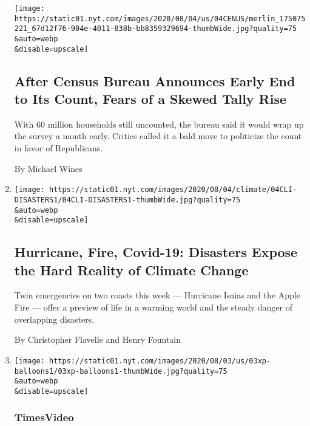 \begin{enumerate}
  \texttt{[image: https://static01.nyt.com/images/2020/08/04/us/04CENUS/merlin\_175075221\_67d12f76-904e-4011-838b-bb8359329694-thumbWide.jpg?quality=75\\\&auto=webp\\\&disable=upscale]}

  \hypertarget{after-census-bureau-announces-early-end-to-its-count-fears-of-a-skewed-tally-rise}{%
  \subsection{After Census Bureau Announces Early End to Its Count,
  Fears of a Skewed Tally
  Rise}\label{after-census-bureau-announces-early-end-to-its-count-fears-of-a-skewed-tally-rise}}

  With 60 million households still uncounted, the bureau said it would
  wrap up the survey a month early. Critics called it a bald move to
  politicize the count in favor of Republicans.

  By Michael Wines
\item
  \href{/2020/08/04/climate/hurricane-isaias-apple-fire-climate.html}{}

  \texttt{[image: https://static01.nyt.com/images/2020/08/04/climate/04CLI-DISASTERS1/04CLI-DISASTERS1-thumbWide.jpg?quality=75\\\&auto=webp\\\&disable=upscale]}

  \hypertarget{hurricane-fire-covid-19-disasters-expose-the-hard-reality-of-climate-change}{%
  \subsection{Hurricane, Fire, Covid-19: Disasters Expose the Hard
  Reality of Climate
  Change}\label{hurricane-fire-covid-19-disasters-expose-the-hard-reality-of-climate-change}}

  Twin emergencies on two coasts this week --- Hurricane Isaias and the
  Apple Fire --- offer a preview of life in a warming world and the
  steady danger of overlapping disasters.

  By Christopher Flavelle and Henry Fountain
\item
  \href{/video/us/100000007271780/wyoming-hot-air-balloon-crash.html}{}

  \texttt{[image: https://static01.nyt.com/images/2020/08/03/us/03xp-balloons1/03xp-balloons1-thumbWide.jpg?quality=75\\\&auto=webp\\\&disable=upscale]}

  \hypertarget{timesvideo-1}{%
  \subsubsection{TimesVideo}\label{timesvideo-1}}


\end{enumerate}
